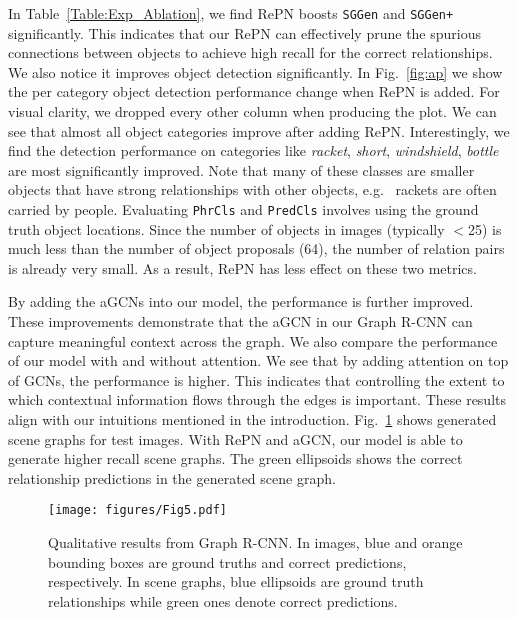In Table~\ref{Table:Exp_Ablation}, we find RePN boosts \texttt{SGGen} and \texttt{SGGen+} significantly. This indicates that our RePN can effectively prune the spurious connections between objects to achieve high recall for the correct relationships. We also notice it improves object detection significantly. In Fig.~\ref{fig:ap} we show the per category object detection performance change when RePN is added. For visual clarity, we dropped every other column when producing the plot. We can see that almost all object categories improve after adding RePN. Interestingly, we find the detection performance on categories like \textit{racket}, \textit{short}, \textit{windshield}, \textit{bottle} are most significantly improved. 
Note that many of these classes are smaller objects that have strong relationships with other objects, e.g.~ rackets are often carried by people. Evaluating \texttt{PhrCls} and \texttt{PredCls} involves using the ground truth object locations. Since the number of objects in images (typically $<$25) is much less than the number of object proposals (64), the number of relation pairs is already very small. As a result, RePN has less effect on these two metrics.

By adding the aGCNs into our model, the performance is further improved. These improvements demonstrate that the aGCN in our Graph R-CNN can capture meaningful context across the graph. We also compare the performance of our model with and without attention. We see that by adding attention on top of GCNs, the performance is higher. This indicates that controlling the extent to which contextual information flows through the edges is important. These results align with our intuitions mentioned in the introduction. Fig.~\ref{fig:qualitative} shows generated scene graphs for test images. With RePN and aGCN, our model is able to generate higher recall scene graphs. The green ellipsoids shows the correct relationship predictions in the generated scene graph.

\begin{figure}[t]
  \begin{center}
    \texttt{[image: figures/Fig5.pdf]}
  \end{center}
\caption{Qualitative results from Graph R-CNN. In images, blue and orange bounding boxes are ground truths and correct predictions, respectively. In scene graphs, blue ellipsoids are ground truth relationships while green ones denote correct predictions.}
\label{fig:qualitative}
\end{figure}


